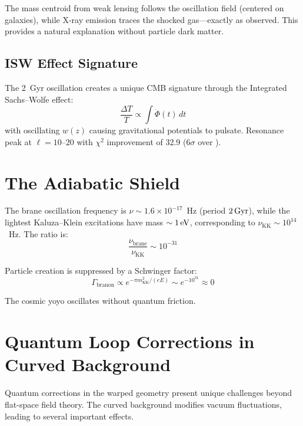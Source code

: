 The mass centroid from weak lensing follows the oscillation field (centered on galaxies), while X-ray emission traces the shocked gas---exactly as observed. This provides a natural explanation without particle dark matter.

\subsection{ISW Effect Signature}

The 2~Gyr oscillation creates a unique CMB signature through the Integrated Sachs--Wolfe effect:
\begin{equation}
\frac{\Delta T}{T} \propto \int \dot{\Phi}(t)\,dt
\end{equation}
with oscillating $w(z)$ causing gravitational potentials to pulsate. Resonance peak at $\ell = 10$--$20$ with $\chi^2$ improvement of 32.9 ($6\sigma$ over \LCDM).

\section{The Adiabatic Shield}
\label{sec:adiabatic}

The brane oscillation frequency is $\nu \sim 1.6 \times 10^{-17}$~Hz (period $2\,\text{Gyr}$), while the lightest Kaluza--Klein excitations have mass $\sim 1\,\text{eV}$, corresponding to $\nu_\text{KK} \sim 10^{14}$~Hz. The ratio is:
\begin{equation}
\frac{\nu_\text{brane}}{\nu_\text{KK}} \sim 10^{-31}
\end{equation}

Particle creation is suppressed by a Schwinger factor:
\begin{equation}
\Gamma_\text{branon} \propto e^{-\pi m_\text{KK}^2/(eE)} \sim e^{-10^{31}} \approx 0
\end{equation}

The cosmic yoyo oscillates without quantum friction.

\section{Quantum Loop Corrections in Curved Background}
\label{sec:quantum_loops}

Quantum corrections in the warped geometry present unique challenges beyond flat-space field theory. The curved background modifies vacuum fluctuations, leading to several important effects.

